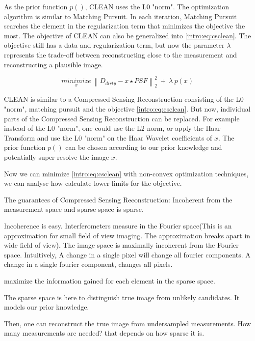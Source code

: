 As the prior function $p()$, CLEAN uses the L0 "norm". The optimization algorithm is similar to Matching Pursuit. In each iteration, Matching Pursuit searches the element in the regularization term that minimizes the objective the most. The objective of CLEAN can also be generalized into \eqref{intro:eq:csclean}. The objective still has a data and regularization term, but now the parameter $\lambda$ represents the trade-off between reconstructing close to the measurement and reconstructing a plausible image.

\begin{equation}\label{intro:eq:csclean}
\underset{x}{minimize} \: \left \| D_{dirty} - x \star PSF \right \|_2^2 \: + \: \lambda \: p(x) 
\end{equation}

CLEAN is similar to a Compressed Sensing Reconstruction consisting of the L0 "norm", matching pursuit and the objective \eqref{intro:eq:csclean}. But now, individual parts of the Compressed Sensing Reconstruction can be replaced. For example instead of the L0 "norm", one could use the L2 norm, or apply the Haar Transform and use the L0 "norm" on the Haar Wavelet coefficients of $x$. The prior function $p()$ can be chosen according to our prior knowledge and potentially super-resolve the image $x$.


Now we can minimize \eqref{intro:eq:csclean} with non-convex optimization techniques, we can analyse how calculate lower limits for the objective.




The guarantees of Compressed Sensing Reconstruction: Incoherent from the measurement space and sparse space is sparse.

Incoherence is easy. Interferometers measure in the Fourier space(This is an approximation for small field of view imaging. The approximation breaks apart in wide field of view). The image space is maximally incoherent from the Fourier space. Intuitively, A change in a single pixel will change all fourier components. A change in a single fourier component, changes all pixels.

maximize the information gained for each element in the sparse space.

The sparse space is here to distinguish true image from unlikely candidates. It models our prior knowledge.

Then, one can reconstruct the true image from undersampled measurements. How many measurements are needed? that depends on how sparse it is. 


